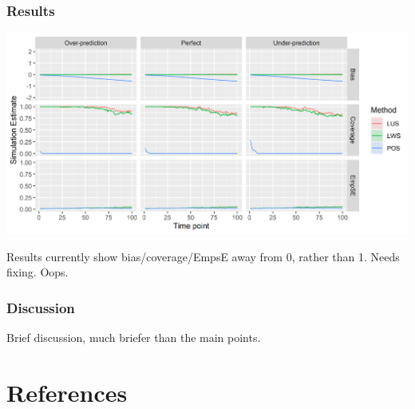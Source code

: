 \documentclass[
]{article}
\begin{document}
\hypertarget{results-2}{%
\subsubsection{Results}\label{results-2}}

\includegraphics{figure/IPCW_Logistic/SlopePlot_b(1)_g(0)_e(0.5).png}

Results currently show bias/coverage/EmpsE away from 0, rather than 1. Needs fixing. Oops.

\hypertarget{discussion-2}{%
\subsubsection{Discussion}\label{discussion-2}}

Brief discussion, much briefer than the main points.

\hypertarget{references}{%
\section*{References}\label{references}}
\end{document}
